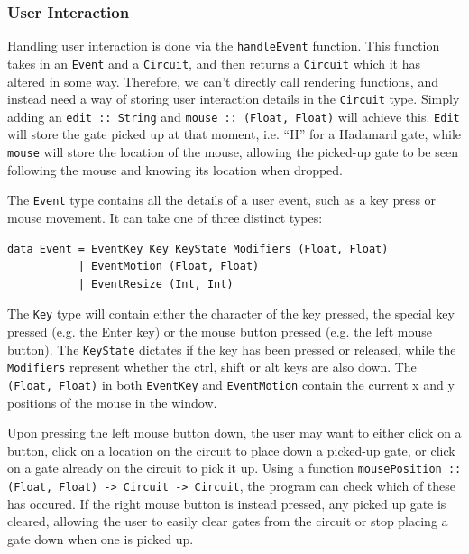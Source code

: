 \documentclass[a4paper,10pt, titlepage, twoside]{article}
\begin{document}
\subsubsection{User Interaction}
Handling user interaction is done via the \texttt{handleEvent} function. This function takes in an \texttt{Event} and a \texttt{Circuit}, and then returns a \texttt{Circuit} which it has altered in some way. Therefore, we can't directly call rendering functions, and instead need a way of storing user interaction details in the \texttt{Circuit} type. Simply adding an \texttt{edit :: String} and \texttt{mouse :: (Float, Float)} will achieve this. \texttt{Edit} will store the gate picked up at that moment, i.e. ``H'' for a Hadamard gate, while \texttt{mouse} will store the location of the mouse, allowing the picked-up gate to be seen following the mouse and knowing its location when dropped.\par
The \texttt{Event} type contains all the details of a user event, such as a key press or mouse movement. It can take one of three distinct types:
\begin{verbatim}
data Event = EventKey Key KeyState Modifiers (Float, Float)
           | EventMotion (Float, Float)
           | EventResize (Int, Int)
\end{verbatim}
The \texttt{Key} type will contain either the character of the key pressed, the special key pressed (e.g. the Enter key) or the mouse button pressed (e.g. the left mouse button). The \texttt{KeyState} dictates if the key has been pressed or released, while the \texttt{Modifiers} represent whether the ctrl, shift or alt keys are also down. The \texttt{(Float, Float)} in both \texttt{EventKey} and \texttt{EventMotion} contain the current x and y positions of the mouse in the window. \par
Upon pressing the left mouse button down, the user may want to either click on a button, click on a location on the circuit to place down a picked-up gate, or click on a gate already on the circuit to pick it up. Using a function \texttt{mousePosition :: (Float, Float) -> Circuit -> Circuit}, the program can check which of these has occured. If the right mouse button is instead pressed, any picked up gate is cleared, allowing the user to easily clear gates from the circuit or stop placing a gate down when one is picked up.\par
\end{document}
